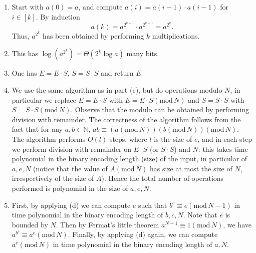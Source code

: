 \documentclass[11pt]{article}
\newcommand{\setN}{\mathbb{N}}
\begin{document}
\begin{enumerate}[1)]
\begin{solution}
\begin{enumerate}
\item Start with $a(0) = a$, and compute $a(i) = a(i− 1)· a(i− 1)$ for $i ∈ [k]$. By induction
$$a(k) = a^{2^{k−1}}· a^{2^{k−1}} = a^{2^k}.$$
Thus, $a^{2^k}$ has been obtained by performing $k$ multiplications.
\item  This has $\log(a^{2^k}) = Θ(2^k \log a)$ many bits.
\item One has $E = E\cdot S$, $S = S\cdot S$ and return $E$.
\item We use the same algorithm as in part (c), but do operations modulo $N$, in particular we replace $E
= E\cdot S$ with $E = E\cdot S (\text{mod}\, N)$ and $S = S\cdot S$ with $S = S\cdot S (\text{mod}\, N)$. Observe that the modulo can be obtained by performing division with remainder. 
The correctness of the algorithm follows from the fact that for any $a, b ∈ \setN$, $ab ≡ (a (\text{mod}\, N))(b (\text{mod}\, N)) (\text{mod}\, N)$. The algorithm performs
$O(l)$ steps, where $l$ is the size of $e$, and in each step we perform division with remainder on
$E \cdot S$ (or $S \cdot S$) and $N$: this takes time polynomial in the binary encoding length (size) of the
input, in particular of $a, e, N$ (notice that the value of $A (\text{mod}\, N)$ has size at most the size of $N$,
irrespectively of the size of $A$). Hence the total number of operations performed is polynomial
in the size of $a, e, N$.
\item  

First, by applying (d) we can compute $e$ such that $b^c \equiv e (\text{mod}\, N-1)$ in time polynomial in the binary encoding length of $b,c,N$. 
Note that $e$ is bounded by $N$. Then by Fermat's little theorem $a^{N-1}\equiv 1 (\text{mod}\, N)$, we have $a^{b^c} \equiv a^e (\text{mod}\, N)$.
Finally, by applying (d) again, we can compute $a^e (\text{mod}\, N)$ in time polynomial in the binary encoding length of $a, N$.

\end{enumerate}
\end{solution}



\end{enumerate}
\end{document}
